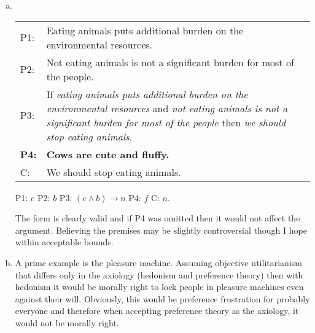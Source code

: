 \documentclass[a4paper, 11pt]{article}
\begin{document}
\begin{enumerate}[(a)]
	\item
	\, \vspace{-0.7cm}
	
	\begin{tabular}{lp{12cm}}
	P1: & Eating animals puts additional burden on the environmental resources.\\
	P2: & Not eating animals is not a significant burden for most of the people.\\
	P3: & If \emph{eating animals puts additional burden on the environmental resources} and \emph{not eating animals is not a significant burden for most of the people} then \emph{we should stop eating animals}.\\
	\textbf{P4:} & \textbf{Cows are cute and fluffy.} \\
    \hline
    C: & We should stop eating animals.
	\end{tabular}
	
	\vspace{0.4cm}
	
	P1: $e$ \qquad
	P2: $b$ \qquad
	P3: $(e \wedge b) \rightarrow n$ \qquad
	P4: $f$ \qquad
	C: $n$.
	
    The form is clearly valid and if P4 was omitted then it would not affect the argument.
    Believing the premises may be slightly controversial though I hope within acceptable bounds.
    
    \item
    A prime example is the pleasure machine.
    Assuming objective utilitarianism that differs only in the axiology (hedonism and preference theory) then with hedonism it would be morally right to lock people in pleasure machines even against their will.
    Obviously, this would be preference frustration for probably everyone and therefore when accepting preference theory as the axiology, it would not be morally right.
\end{enumerate}



\end{document}
